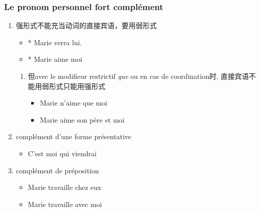 \documentclass[UTF8]{report}
\begin{document}
\subsubsection{Le pronom personnel fort complément}
\begin{enumerate}
    \item 强形式不能充当动词的直接宾语，要用弱形式
    \begin{itemize}
        \item * Marie verra lui.
        \item * Marie aime moi
    \end{itemize}
    \begin{enumerate}
        \item 但avec le modifieur restrictif \emph{que} ou en cas de coordination时, 直接宾语不能用弱形式只能用强形式
        \begin{itemize}
            \item Marie n’aime que moi
            \item Marie aime son père et moi
        \end{itemize}
    \end{enumerate}
    \item complément d’une forme présentative 
    \begin{itemize}
        \item C’est moi qui viendrai
    \end{itemize}
    \item complément de préposition
    \begin{itemize}
        \item Marie travaille chez eux
        \item Marie travaille avec moi
    \end{itemize}
\end{enumerate}
\end{document}
